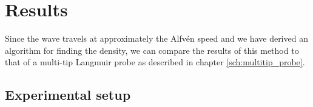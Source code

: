 







\section{Results}

Since the wave travels at approximately the Alfv\'en speed and we have derived an algorithm for finding the density, we can compare the results of this method to that of a multi-tip Langmuir probe as described in chapter \ref{sch:multitip_probe}.

\subsection{Experimental setup}

